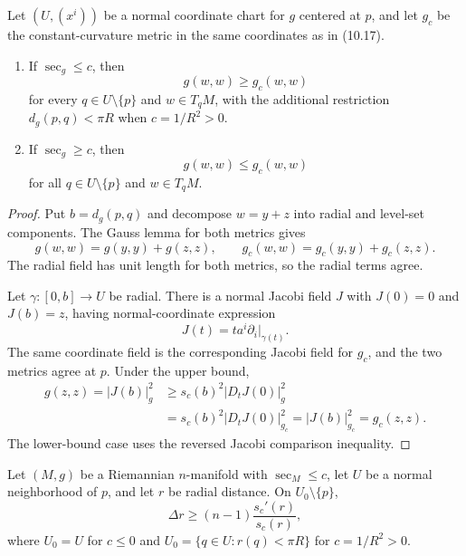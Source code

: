 \begin{theorem}
\label{thm:metric-comparison}
Let $(U,(x^i))$ be a normal coordinate chart for $g$ centered at $p$, and let
$g_c$ be the constant-curvature metric in the same coordinates as in (10.17).
\begin{enumerate}
\item[(a)] If $\sec_g\leq c$, then
\[
g(w,w)\geq g_c(w,w)
\]
for every $q\in U\setminus\{p\}$ and $w\in T_qM$, with the additional
restriction $d_g(p,q)<\pi R$ when $c=1/R^2>0$.
\item[(b)] If $\sec_g\geq c$, then
\[
g(w,w)\leq g_c(w,w)
\]
for all $q\in U\setminus\{p\}$ and $w\in T_qM$.
\end{enumerate}
\end{theorem}

\begin{proof}
\sketch Put $b=d_g(p,q)$ and decompose
$w=y+z$ into radial and level-set components. The Gauss lemma for both metrics
gives
\[
g(w,w)=g(y,y)+g(z,z),
\qquad
g_c(w,w)=g_c(y,y)+g_c(z,z).
\]
The radial field has unit length for both metrics, so the radial terms agree.

Let $\gamma\colon[0,b]\to U$ be radial. There is a normal Jacobi field $J$
with $J(0)=0$ and $J(b)=z$, having normal-coordinate expression
\[
J(t)=t a^i\partial_i|_{\gamma(t)}.
\]
The same coordinate field is the corresponding Jacobi field for $g_c$, and
the two metrics agree at $p$. Under the upper bound,
\begin{align*}
g(z,z)=|J(b)|_g^2
&\geq s_c(b)^2|D_tJ(0)|_g^2\\
&=s_c(b)^2|D_tJ(0)|_{g_c}^2
=|J(b)|_{g_c}^2=g_c(z,z).
\end{align*}
The lower-bound case uses the reversed Jacobi comparison inequality.
\end{proof}

\begin{theorem}
\label{thm:laplacian-comparison-1}
Let $(M,g)$ be a Riemannian $n$-manifold with $\sec_M\leq c$, let $U$ be a
normal neighborhood of $p$, and let $r$ be radial distance. On
$U_0\setminus\{p\}$,
\[
\Delta r\geq(n-1)\frac{s_c'(r)}{s_c(r)},
\]
where $U_0=U$ for $c\leq0$ and
$U_0=\{q\in U:r(q)<\pi R\}$ for $c=1/R^2>0$.
\end{theorem}

